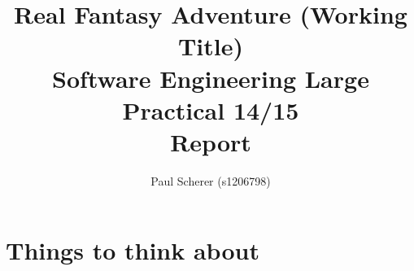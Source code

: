 \documentclass[11pt,a4paper]{article}
\begin{document}
\title{Real Fantasy Adventure (Working Title) \\
Software Engineering Large Practical 14/15 \\
Report}
\author{Paul Scherer (s1206798)}
\maketitle
\newpage

\section{Things to think about}
\end{document}
